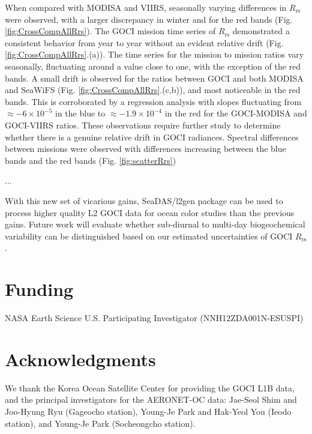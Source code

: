 \documentclass[]{interact}
\theoremstyle{plain}%
\theoremstyle{definition}
\theoremstyle{remark}
\begin{document}

When compared with MODISA and VIIRS, seasonally varying differences in $R_\text{rs}$ were observed, with a larger discrepancy in winter and for the red bands (Fig. \ref{fig:CrossCompAllRrs}). The GOCI mission time series of $R_\text{rs}$ demonstrated a consistent behavior from year to year without an evident relative drift (Fig. \ref{fig:CrossCompAllRrs}.(a)). The time series for the mission to mission ratios vary seasonally, fluctuating around a value close to one, with the exception of the red bands. A small drift is observed for the ratios between GOCI and both MODISA and SeaWiFS (Fig. \ref{fig:CrossCompAllRrs}.(c,b)), and most noticeable in the red bands. This is corroborated by a regression analysis with slopes fluctuating from $\approx-6\times10^{-5}$ in the blue to $\approx-1.9\times10^{-4}$ in the red for the GOCI-MODISA and GOCI-VIIRS ratios. These observations require further study to determine whether there is a genuine relative drift in GOCI radiances. Spectral differences between missions were observed with differences increasing between the blue bands and the red bands (Fig. \ref{fig:scatterRrs})

\cite{Kang2010}...
 
With this new set of vicarious gains, SeaDAS/l2gen package can be used to process higher quality L2 GOCI data for ocean color studies than the previous gains. Future work will evaluate whether sub-diurnal to multi-day biogeochemical variability can be distinguished based on our estimated uncertainties of GOCI $R_\text{rs}$. 

\section*{Funding}
NASA Earth Science U.S. Participating Investigator (NNH12ZDA001N-ESUSPI) 
\section*{Acknowledgments}
We thank the Korea Ocean Satellite Center for providing the GOCI L1B data, and the principal investigators for the AERONET-OC data: Jae-Seol Shim and Joo-Hyung Ryu (Gageocho station), Young-Je Park and Hak-Yeol You (Ieodo station), and Young-Je Park (Socheongcho station). 


\end{document}
